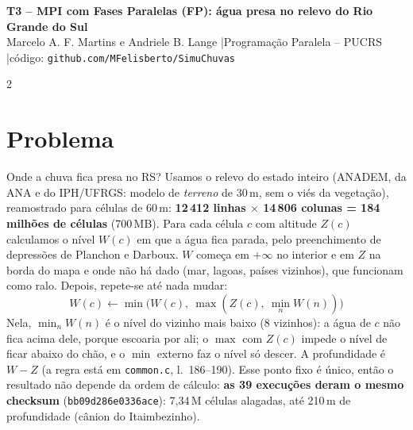 \documentclass[9pt,a4paper]{extarticle}
\begin{document}
\begin{center}
{\large\bfseries T3 -- MPI com Fases Paralelas (FP): água presa no relevo do Rio Grande do Sul}\\[1pt]
{\small Marcelo A. F. Martins e Andriele B. Lange \quad|\quad Programação Paralela -- PUCRS \quad|\quad código: \texttt{github.com/MFelisberto/SimuChuvas}}
\end{center}
\vspace{-4pt}
\begin{multicols}{2}

\section{Problema}
Onde a chuva fica presa no RS? Usamos o relevo do estado inteiro (ANADEM, da ANA e do IPH/UFRGS: modelo de \emph{terreno} de 30\,m, sem o viés da vegetação), reamostrado para células de 60\,m: \textbf{12\,412 linhas $\times$ 14\,806 colunas = 184 milhões de células} (700\,MB). Para cada célula $c$ com altitude $Z(c)$ calculamos o nível $W(c)$ em que a água fica parada, pelo preenchimento de depressões de Planchon e Darboux. $W$ começa em $+\infty$ no interior e em $Z$ na borda do mapa e onde não há dado (mar, lagoas, países vizinhos), que funcionam como ralo. Depois, repete-se até nada mudar:
\[ W(c) \leftarrow \min\bigl(W(c),\ \max(Z(c),\ \min_{n} W(n))\bigr) \]
Nela, $\min_n W(n)$ é o nível do vizinho mais baixo (8 vizinhos): a água de $c$ não fica acima dele, porque escoaria por ali; o $\max$ com $Z(c)$ impede o nível de ficar abaixo do chão, e o $\min$ externo faz o nível só descer. A profundidade é $W-Z$ (a regra está em \texttt{common.c}, l.~186--190). Esse ponto fixo é único, então o resultado não depende da ordem de cálculo: \textbf{as 39 execuções deram o mesmo checksum} (\texttt{bb09d286e0336ace}): 7,34\,M células alagadas, até 210\,m de profundidade (cânion do Itaimbezinho).


\end{multicols}
\end{document}
